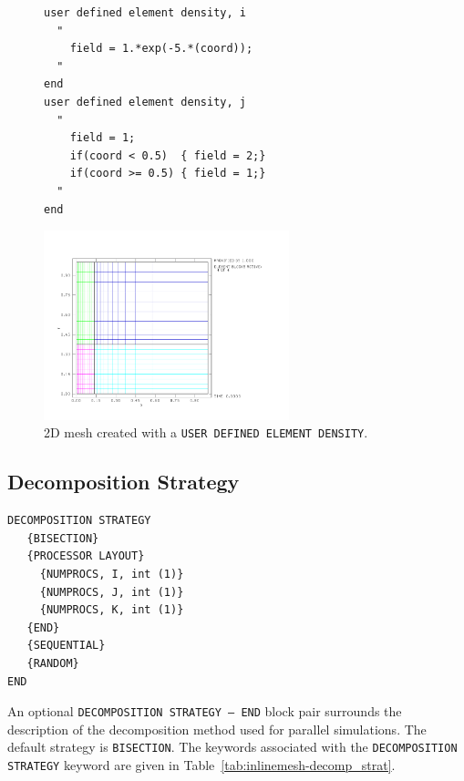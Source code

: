 \begin{figure}[htbp]
  \centering
    \begin{minipage}{0.5\linewidth}
{\ttfamily \begin{verbatim}
user defined element density, i
  "
    field = 1.*exp(-5.*(coord));
  "
end
user defined element density, j
  "
    field = 1;
    if(coord < 0.5)  { field = 2;}
    if(coord >= 0.5) { field = 1;}
  "
end
\end{verbatim}}
    \end{minipage}%
    \hfill
    \begin{minipage}{0.45\linewidth}
      \centering
        \includegraphics[width=2.8in]{figures/bias_example}
    \end{minipage}
    \caption{2D mesh created with a \texttt{USER
      DEFINED ELEMENT DENSITY}.}
    \label{fig:bias_example}
\end{figure}

\renewcommand{\textfraction}{0.2}
\renewcommand{\topfraction}{0.7}
\renewcommand{\bottomfraction}{0.3}
\renewcommand{\floatpagefraction}{0.5}

\clearpage
\subsection{Decomposition Strategy}
\label{sec:inline-decomposition-strategy}

{\ttfamily \begin{verbatim}
DECOMPOSITION STRATEGY
   {BISECTION}
   {PROCESSOR LAYOUT}
     {NUMPROCS, I, int (1)}
     {NUMPROCS, J, int (1)}
     {NUMPROCS, K, int (1)}
   {END}
   {SEQUENTIAL}
   {RANDOM}
END
\end{verbatim}
}

An optional \texttt{DECOMPOSITION STRATEGY -- END} block pair surrounds the description
of the decomposition method used for parallel simulations. The default strategy is \texttt{BISECTION}. The keywords associated
with the \texttt{DECOMPOSITION STRATEGY} keyword are given in
Table~\ref{tab:inlinemesh-decomp_strat}.

